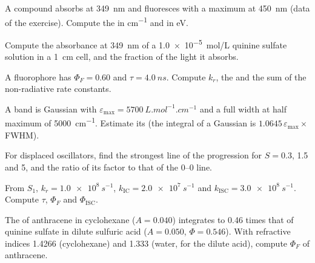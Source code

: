 \begin{exercise}[$\star$]\label{exo:b3:electronic-spectroscopy:2}
A compound absorbs at \qty{349}{nm} and fluoresces with a maximum at
\qty{450}{nm} (data of the exercise). Compute the  in \unit{cm^{-1}} and in
eV.
\end{exercise}

\begin{exercise}[$\star$]\label{exo:b3:electronic-spectroscopy:3}
Compute the absorbance at \qty{349}{nm} of a \qty{1.0e-5}{mol/L} quinine sulfate
solution in a \qty{1}{cm} cell, and the fraction of the light it absorbs.
\end{exercise}

\begin{exercise}[$\star$]\label{exo:b3:electronic-spectroscopy:4}
A fluorophore has $\Phi_F = 0.60$ and $\tau = \qty{4.0}{ns}$. Compute $k_r$, the
 and the sum of the non-radiative rate constants.
\end{exercise}

\begin{exercise}[$\star\star$]\label{exo:b3:electronic-spectroscopy:5}
A band is Gaussian with $\varepsilon_{\max} = \qty{5700}{L.mol^{-1}.cm^{-1}}$ and a full width at
half maximum of \qty{5000}{cm^{-1}}. Estimate its  (the integral
of a Gaussian is $1.0645\,\varepsilon_{\max}\times$FWHM).
\end{exercise}

\begin{exercise}[$\star\star$]\label{exo:b3:electronic-spectroscopy:6}
For displaced oscillators, find the strongest line of the progression for
$S = 0.3$, 1.5 and 5, and the ratio of its factor to that of the 0--0 line.
\end{exercise}

\begin{exercise}[$\star\star$]\label{exo:b3:electronic-spectroscopy:7}
From $S_1$, $k_r = \qty{1.0e8}{s^{-1}}$, $k_{\mathrm{IC}} = \qty{2.0e7}{s^{-1}}$ and $k_{\mathrm{ISC}} =
\qty{3.0e8}{s^{-1}}$. Compute $\tau$, $\Phi_F$ and $\Phi_{\mathrm{ISC}}$.
\end{exercise}

\begin{exercise}[$\star\star$]\label{exo:b3:electronic-spectroscopy:8}
The  of anthracene in cyclohexane ($A = 0.040$) integrates to 0.46
times that of quinine sulfate in dilute sulfuric acid ($A = 0.050$, $\Phi =
0.546$). With refractive indices 1.4266 (cyclohexane) and 1.333 (water, for the
dilute acid), compute $\Phi_F$ of anthracene.
\end{exercise}

